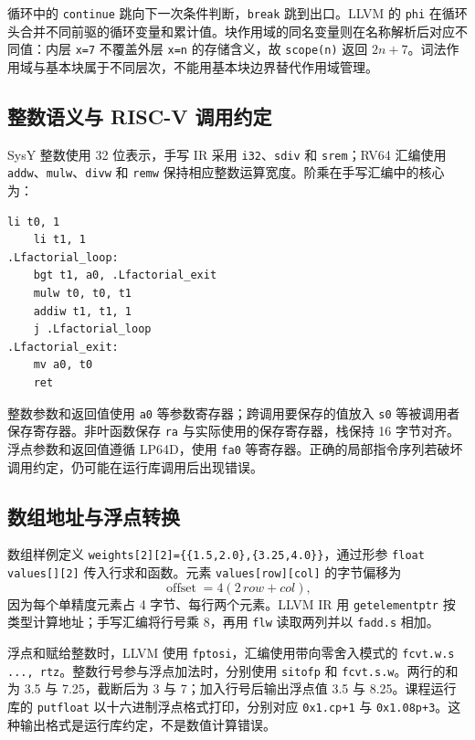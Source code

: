 \documentclass[UTF8,a4paper,10pt,fontset=fandol]{ctexart}
\begin{document}
循环中的 \texttt{continue} 跳向下一次条件判断，\texttt{break} 跳到出口。LLVM 的 \texttt{phi} 在循环头合并不同前驱的循环变量和累计值。块作用域的同名变量则在名称解析后对应不同值：内层 \texttt{x=7} 不覆盖外层 \texttt{x=n} 的存储含义，故 \texttt{scope(n)} 返回 $2n+7$。词法作用域与基本块属于不同层次，不能用基本块边界替代作用域管理。

\subsection{整数语义与 RISC-V 调用约定}
SysY 整数使用 32 位表示，手写 IR 采用 \texttt{i32}、\texttt{sdiv} 和 \texttt{srem}；RV64 汇编使用 \texttt{addw}、\texttt{mulw}、\texttt{divw} 和 \texttt{remw} 保持相应整数运算宽度。阶乘在手写汇编中的核心为：
\par\noindent\begin{minipage}{\linewidth}
\begin{lstlisting}[numbers=none]
    li t0, 1
    li t1, 1
.Lfactorial_loop:
    bgt t1, a0, .Lfactorial_exit
    mulw t0, t0, t1
    addiw t1, t1, 1
    j .Lfactorial_loop
.Lfactorial_exit:
    mv a0, t0
    ret
\end{lstlisting}
\end{minipage}\par
整数参数和返回值使用 \texttt{a0} 等参数寄存器；跨调用要保存的值放入 \texttt{s0} 等被调用者保存寄存器。非叶函数保存 \texttt{ra} 与实际使用的保存寄存器，栈保持 16 字节对齐。浮点参数和返回值遵循 LP64D，使用 \texttt{fa0} 等寄存器\cite{riscv}。正确的局部指令序列若破坏调用约定，仍可能在运行库调用后出现错误。

\subsection{数组地址与浮点转换}
数组样例定义 \texttt{weights[2][2]=\{\{1.5,2.0\},\{3.25,4.0\}\}}，通过形参 \texttt{float values[][2]} 传入行求和函数。元素 \texttt{values[row][col]} 的字节偏移为
\[
  \operatorname{offset}=4(2\,row+col),
\]
因为每个单精度元素占 4 字节、每行两个元素。LLVM IR 用 \texttt{getelementptr} 按类型计算地址；手写汇编将行号乘 8，再用 \texttt{flw} 读取两列并以 \texttt{fadd.s} 相加。

浮点和赋给整数时，LLVM 使用 \texttt{fptosi}，汇编使用带向零舍入模式的 \texttt{fcvt.w.s ..., rtz}。整数行号参与浮点加法时，分别使用 \texttt{sitofp} 和 \texttt{fcvt.s.w}。两行的和为 3.5 与 7.25，截断后为 3 与 7；加入行号后输出浮点值 3.5 与 8.25。课程运行库的 \texttt{putfloat} 以十六进制浮点格式打印，分别对应 \texttt{0x1.cp+1} 与 \texttt{0x1.08p+3}。这种输出格式是运行库约定，不是数值计算错误。
\end{document}
